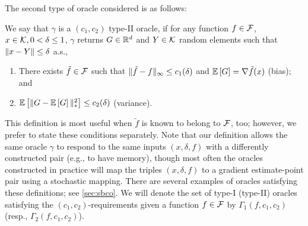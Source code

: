 The second type of oracle considered is as follows:
\begin{definition}
\label{def:oracle2}
We say that $\gamma$ is a  $(c_1,c_2)$ type-II oracle, if for any function $f\in \mathcal{F}$,
$x\in \mathcal{K},0<\delta\le 1$, $\gamma$ returns $G\in \mathbb{R}^d$ and  $Y\in \mathcal{K}$ random elements such that $\|x-Y\|\le \delta$ a.s.,
\vspace{-0.2cm}
\begin{enumerate}
\item There exists $\tilde{f} \in \mathcal{F}$ such that
$\|\tilde{f}- f\|_\infty \le c_1(\delta)$  and
$\mathbb{E}\left[G\right]  = \nabla \tilde{f}(x)$ (bias); and
\item $\mathbb{E}\left[\| G -  \mathbb{E}\left[G\right] \|_*^2\right] \le c_2(\delta)$ (variance).
\end{enumerate}
\end{definition}
This definition is most useful when $\tilde{f}$ is known to belong to $\mathcal{F}$, too; however, we prefer to state these conditions separately.
%
Note that our definition allows the same oracle $\gamma$ to respond to the same inputs $(x,\delta,f)$ with a differently constructed pair (e.g., to have memory),
though most often the oracles constructed in practice
will map the triples $(x,\delta,f)$ to a gradient estimate-point pair using a stochastic mapping.
There are several examples of oracles satisfying these definitions; see \cref{sec:sbco}.
We will denote the set of type-I (type-II) oracles satisfying the $(c_1,c_2)$-requirements given a function $f\in \mathcal{F}$ by $\Gamma_1(f,c_1,c_2)$ (resp., $\Gamma_2(f,c_1,c_2)$).





